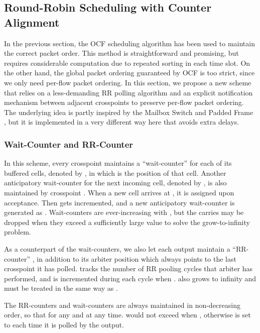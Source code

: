 \documentclass[journal,final,doublecolumn,10pt,twoside]{IEEEtranTCOM} \normalsize
\begin{document}
\subsection{Round-Robin Scheduling with Counter Alignment}
\label{sec:RR}

In the previous section, the OCF scheduling algorithm has been used to maintain the correct packet order. This method is straightforward and promising, but requires considerable computation due to repeated sorting in each time slot. On the other hand, the global packet ordering guaranteed by OCF is too strict, since we only need per-flow packet ordering. In this section, we propose a new scheme that relies on a less-demanding RR polling algorithm and an explicit notification mechanism between adjacent crosspoints to preserve per-flow packet ordering. The underlying idea is partly inspired by the Mailbox Switch \cite{mailbox} and Padded Frame \cite{frame02}, but it is implemented in a very different way here that avoids extra delays.



\subsubsection{Wait-Counter and RR-Counter}
\label{wait}

In this scheme, every crosspoint maintains a ``wait-counter'' for each of its buffered cells, denoted by , in which  is the position of that cell. Another anticipatory wait-counter for the next incoming cell, denoted by , is also maintained by crosspoint . When a new cell arrives at , it is assigned  upon acceptance. Then  gets incremented, and a new anticipatory wait-counter is generated as . Wait-counters  are ever-increasing with , but the carries may be dropped when they exceed a sufficiently large value to solve the grow-to-infinity problem.

As a counterpart of the wait-counters, we also let each output  maintain a ``RR-counter'' , in addition to its arbiter position  which always points to the last crosspoint it has polled.  tracks the number of RR pooling cycles that arbiter  has performed, and is incremented during each cycle when .  also grows to infinity and must be treated in the same way as .

The RR-counters and wait-counters  are always maintained in non-decreasing order, so that  for any  and  at any time.  would not exceed  when , otherwise  is set to  each time it is polled by the output. 
\end{document}
